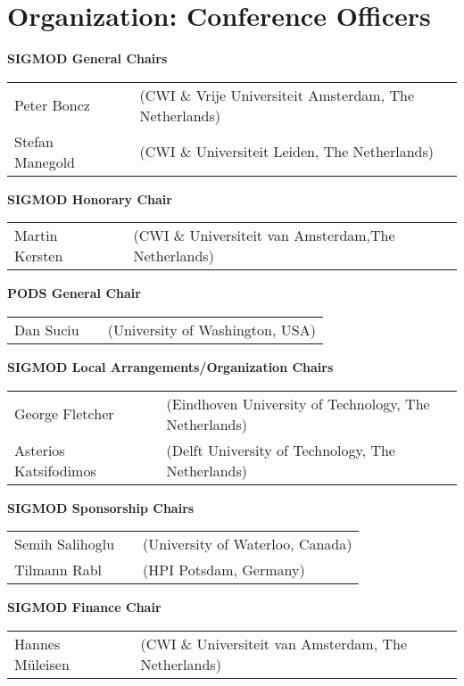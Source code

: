 
\section{Organization: Conference Officers}

{
\setlength{\tabcolsep}{0pt}

\textbf{SIGMOD General Chairs}

\begin{tabular}{lp{.5em}l}
Peter Boncz	&& \textsf{\small(CWI \& Vrije Universiteit Amsterdam, The Netherlands)}	\\
Stefan Manegold	&& \textsf{\small(CWI \& Universiteit Leiden, The Netherlands)}	\\
\end{tabular}

\vfill
\textbf{SIGMOD Honorary Chair}

\begin{tabular}{lp{.5em}l}
Martin Kersten	&& \textsf{\small(CWI \& Universiteit van Amsterdam,The Netherlands)}
\end{tabular}

\vfill
\textbf{PODS General Chair}

\begin{tabular}{lp{.5em}l}
Dan Suciu	&& \textsf{\small(University of Washington, USA)}
\end{tabular}

\vfill
\textbf{SIGMOD Local Arrangements/Organization Chairs}

\begin{tabular}{lp{.5em}l}
George Fletcher	&& \hspace{-6.5mm}\textsf{\small(Eindhoven University of Technology, The Netherlands)}	\\
Asterios Katsifodimos	&& \textsf{\small(Delft University of Technology, The Netherlands)}
\end{tabular}

\vfill
\textbf{SIGMOD Sponsorship Chairs}

\begin{tabular}{lp{.5em}l}
Semih Salihoglu	&& \textsf{\small(University of Waterloo, Canada)}	\\
Tilmann Rabl	&& \textsf{\small(HPI Potsdam, Germany)}
\end{tabular}

\vfill
\textbf{SIGMOD Finance Chair}

\begin{tabular}{lp{.5em}l}
Hannes M\"uleisen	&& \textsf{\small(CWI \& Universiteit van Amsterdam, The Netherlands)}
\end{tabular}

}
